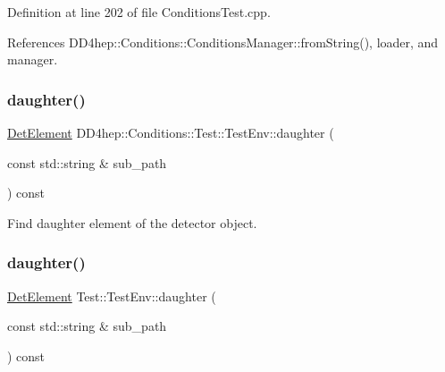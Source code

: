 Definition at line 202 of file Conditions\+Test.\+cpp.



References D\+D4hep\+::\+Conditions\+::\+Conditions\+Manager\+::from\+String(), loader, and manager.

\hypertarget{struct_d_d4hep_1_1_conditions_1_1_test_1_1_test_env_a77ad534bcc9fa4e203fff625bedefa7e}{}\label{struct_d_d4hep_1_1_conditions_1_1_test_1_1_test_env_a77ad534bcc9fa4e203fff625bedefa7e} 
\subsubsection{\texorpdfstring{daughter()}{daughter()}\hspace{0.1cm}{\footnotesize\ttfamily [1/2]}}
{\footnotesize\ttfamily \hyperlink{class_d_d4hep_1_1_geometry_1_1_det_element}{Det\+Element} D\+D4hep\+::\+Conditions\+::\+Test\+::\+Test\+Env\+::daughter (\begin{DoxyParamCaption}\item[{const std\+::string \&}]{sub\+\_\+path }\end{DoxyParamCaption}) const}



Find daughter element of the detector object. 

\hypertarget{struct_d_d4hep_1_1_conditions_1_1_test_1_1_test_env_a44d36687a11a397c8ca7121b126d85b6}{}\label{struct_d_d4hep_1_1_conditions_1_1_test_1_1_test_env_a44d36687a11a397c8ca7121b126d85b6} 
\subsubsection{\texorpdfstring{daughter()}{daughter()}\hspace{0.1cm}{\footnotesize\ttfamily [2/2]}}
{\footnotesize\ttfamily \hyperlink{class_d_d4hep_1_1_geometry_1_1_det_element}{Det\+Element} Test\+::\+Test\+Env\+::daughter (\begin{DoxyParamCaption}\item[{const std\+::string \&}]{sub\+\_\+path }\end{DoxyParamCaption}) const}



